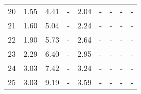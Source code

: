 \begin{table}
\begin{tabular}{lllllllll}
20 &  1.55 &  4.41 &       - &  2.04 &      - &       - &        - &        - \\
21 &  1.60 &  5.04 &       - &  2.24 &      - &       - &        - &        - \\
22 &  1.90 &  5.73 &       - &  2.64 &      - &       - &        - &        - \\
23 &  2.29 &  6.40 &       - &  2.95 &      - &       - &        - &        - \\
24 &  3.03 &  7.42 &       - &  3.24 &      - &       - &        - &        - \\
25 &  3.03 &  9.19 &       - &  3.59 &      - &       - &        - &        - \\
\bottomrule
\end{tabular}
\end{table}
